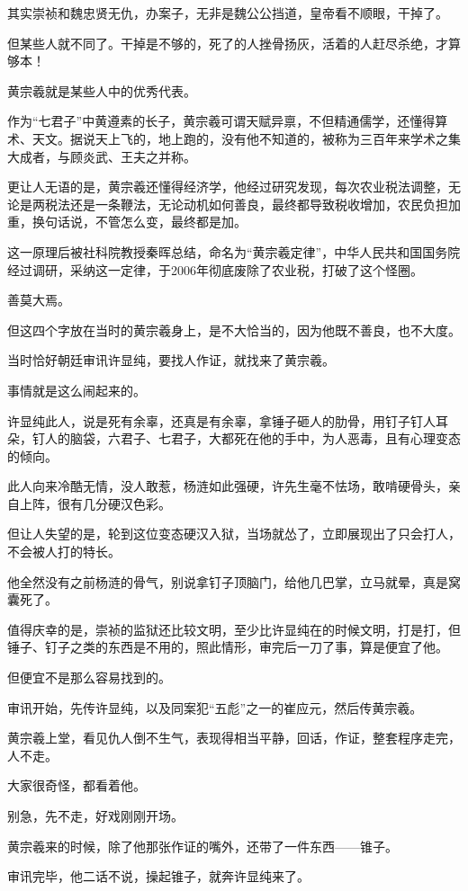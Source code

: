 \begin{multicols}{\theparacolNo}
		其实崇祯和魏忠贤无仇，办案子，无非是魏公公挡道，皇帝看不顺眼，干掉了。

		但某些人就不同了。干掉是不够的，死了的人挫骨扬灰，活着的人赶尽杀绝，才算够本！

		黄宗羲就是某些人中的优秀代表。

		作为“七君子”中黄遵素的长子，黄宗羲可谓天赋异禀，不但精通儒学，还懂得算术、天文。据说天上飞的，地上跑的，没有他不知道的，被称为三百年来学术之集大成者，与顾炎武、王夫之并称。

		更让人无语的是，黄宗羲还懂得经济学，他经过研究发现，每次农业税法调整，无论是两税法还是一条鞭法，无论动机如何善良，最终都导致税收增加，农民负担加重，换句话说，不管怎么变，最终都是加。

		这一原理后被社科院教授秦晖总结，命名为“黄宗羲定律”，中华人民共和国国务院经过调研，采纳这一定律，于2006年彻底废除了农业税，打破了这个怪圈。

		善莫大焉。

		但这四个字放在当时的黄宗羲身上，是不大恰当的，因为他既不善良，也不大度。

		当时恰好朝廷审讯许显纯，要找人作证，就找来了黄宗羲。

		事情就是这么闹起来的。

		许显纯此人，说是死有余辜，还真是有余辜，拿锤子砸人的肋骨，用钉子钉人耳朵，钉人的脑袋，六君子、七君子，大都死在他的手中，为人恶毒，且有心理变态的倾向。

		此人向来冷酷无情，没人敢惹，杨涟如此强硬，许先生毫不怯场，敢啃硬骨头，亲自上阵，很有几分硬汉色彩。

		但让人失望的是，轮到这位变态硬汉入狱，当场就怂了，立即展现出了只会打人，不会被人打的特长。

		他全然没有之前杨涟的骨气，别说拿钉子顶脑门，给他几巴掌，立马就晕，真是窝囊死了。

		值得庆幸的是，崇祯的监狱还比较文明，至少比许显纯在的时候文明，打是打，但锤子、钉子之类的东西是不用的，照此情形，审完后一刀了事，算是便宜了他。

		但便宜不是那么容易找到的。

		审讯开始，先传许显纯，以及同案犯“五彪”之一的崔应元，然后传黄宗羲。

		黄宗羲上堂，看见仇人倒不生气，表现得相当平静，回话，作证，整套程序走完，人不走。

		大家很奇怪，都看着他。

		别急，先不走，好戏刚刚开场。

		黄宗羲来的时候，除了他那张作证的嘴外，还带了一件东西——锥子。

		审讯完毕，他二话不说，操起锥子，就奔许显纯来了。


\end{multicols}
